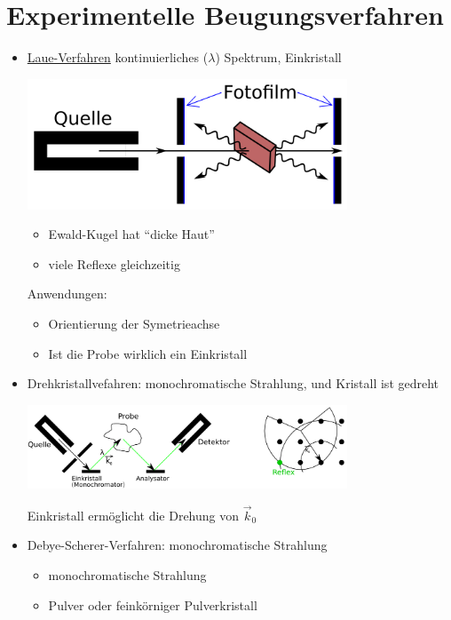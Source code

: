 \section{Experimentelle Beugungsverfahren}

\begin{itemize}
\item \underline{Laue-Verfahren} kontinuierliches (\(\lambda\))
  Spektrum, Einkristall

\includegraphics[width=0.75\textwidth]{kap03_06.png}


\begin{itemize}
\item Ewald-Kugel hat ``dicke Haut''
\item viele Reflexe gleichzeitig
\end{itemize}

Anwendungen:
 \begin{itemize}
 \item Orientierung der Symetrieachse
 \item Ist die Probe wirklich ein Einkristall
 \end{itemize}

\item Drehkristallvefahren: monochromatische Strahlung, und Kristall
  ist gedreht

\includegraphics[width=0.75\textwidth]{kap03_07.png}

Einkristall ermöglicht die Drehung von \(\vec k_0\)

\item Debye-Scherer-Verfahren: monochromatische Strahlung

  \begin{itemize}
  \item monochromatische Strahlung
  \item Pulver oder feinkörniger Pulverkristall
  \end{itemize}



\end{itemize}
